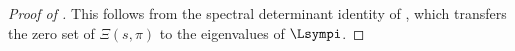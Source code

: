 \begin{proof}[Proof of ]
This follows from the spectral determinant identity of ,
which transfers the zero set of $\Xi(s,\pi)$ to the eigenvalues of $\Lsympi$.
\end{proof}
